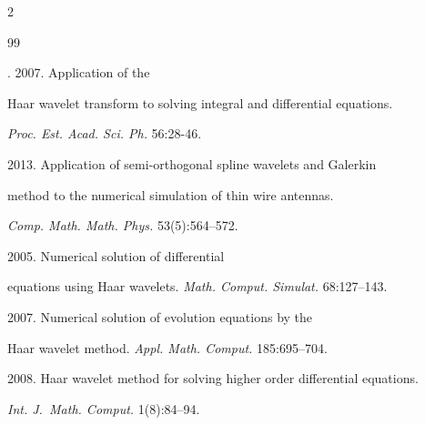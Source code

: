   \begin{multicols}{2}





\renewcommand{\bibname}{\protect\rmfamily References}







{\small\frenchspacing


 {%




 \begin{thebibliography}{99}







. 2007. Application of the


 Haar wavelet transform to solving integral and differential equations. 


 \textit{Proc. Est. Acad. Sci. Ph.} 56:28-46.






2013.  Application of semi-orthogonal spline wavelets and Galerkin


method to the numerical simulation of thin wire antennas. 


\textit{Comp. Math. Math. Phys.} 53(5):564--572.




 2005. Numerical solution of differential 


equations using Haar wavelets. \textit{Math. Comput. Simulat.} 68:127--143.






2007. Numerical solution of evolution equations by the 


Haar wavelet method. \textit{Appl. Math. Comput.} 185:695--704.






2008. Haar wavelet method for solving higher order differential equations. 


\textit{Int. J.~Math. Comput.} 1(8):84--94.






\end{thebibliography}}}
\end{multicols}
